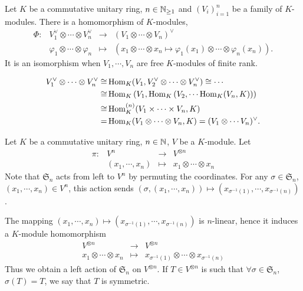\begin{propositionenv}
    Let $K$ be a commutative unitary ring, $n \in \mathbb{N}_{\ge 1}$ and $(V_{i})_{i=1}^n$ be a family of $K$-modules.
    There is a homomorphism of $K$-modules,
    $$\begin{array}{rrcl}
        \Phi : & V_1^\vee \otimes \cdots \otimes V_n^\vee & \longrightarrow & (V_1 \otimes \cdots \otimes V_n)^\vee\\
        & \varphi_1 \otimes \cdots \otimes \varphi_n & \longmapsto & (x_1 \otimes \cdots \otimes x_n \mapsto \varphi_1(x_1) \otimes \cdots \otimes \varphi_n(x_n)).
    \end{array}$$
    It is an isomorphism when $V_1,\cdots,V_n$ are free $K$-modules of finite rank.
\end{propositionenv}
\begin{proofenv}
    $$\begin{aligned}
        V_1^\vee \otimes \cdots \otimes V_n^\vee \cong & \operatorname{\mathrm{Hom}}_{K} (V_1,V_2^\vee \otimes \cdots \otimes V_n^\vee) \cong \cdots\\
        \cong & \operatorname{\mathrm{Hom}}_{K}\left(V_1,\operatorname{\mathrm{Hom}}_{K}\left(V_2,\cdots \operatorname{\mathrm{Hom}}_{K}(V_n,K)\right)\right)\\
        \cong &  \operatorname{\mathrm{Hom}}_{K}^{(n)} (V_1\times \cdots \times V_n,K)\\
        = & \operatorname{\mathrm{Hom}}_{K}(V_1 \otimes \cdots \otimes V_n, K) = (V_1\otimes \cdots V_n)^\vee.
    \end{aligned}$$
\end{proofenv}

\begin{definitionenv}
    Let $K$ be a commutative unitary ring, $n \in \mathbb{N}$, $V$ be a $K$-module.
    Let
    $$\begin{array}{rrcl}
        \pi : & V^n & \longrightarrow & V^{\otimes n}\\
        & (x_1,\cdots,x_n) & \longmapsto & x_1 \otimes \cdots \otimes x_n
    \end{array}$$
    Note that $\mathfrak{S}_n$ acts from left to $V^n$ by permuting the coordinates.
    For any $\sigma \in \mathfrak{S}_n$, $(x_1,\cdots,x_n) \in V^n$, this action sends
    $(\sigma,(x_1,\cdots,x_n)) \mapsto (x_{\sigma^{-1}(1)},\cdots,x_{\sigma^{-1}(n)})$.

    \quad The mapping $(x_1,\cdots,x_n) \mapsto (x_{\sigma^{-1}(1)},\cdots,x_{\sigma^{-1}(n)})$ is $n$-linear, hence it induces a $K$-module homomorphism
    $$\begin{array}{rcl}
        V^{\otimes n} & \longrightarrow & V^{\otimes n}\\
        x_1 \otimes \cdots \otimes x_n & \longmapsto & x_{\sigma^{-1}(1)} \otimes \cdots \otimes x_{\sigma^{-1}(n)}
    \end{array}$$
    Thus we obtain a left action of $\mathfrak{S}_n$ on $V^{\otimes n}$.
    If $T \in V^{\otimes n}$ is such that $\forall \sigma \in \mathfrak{S}_n$, $\sigma(T) = T$, we say that $T$ is symmetric.
\end{definitionenv}

